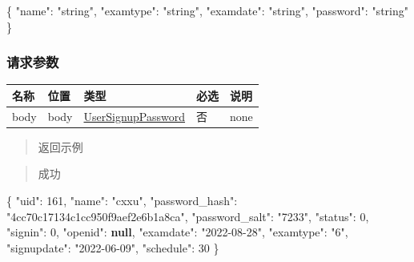 \documentclass[
]{article}
\newenvironment{Shaded}{}{}
\newcommand{\DataTypeTok}[1]{\textcolor[rgb]{0.56,0.13,0.00}{#1}}
\newcommand{\DecValTok}[1]{\textcolor[rgb]{0.25,0.63,0.44}{#1}}
\newcommand{\FunctionTok}[1]{\textcolor[rgb]{0.02,0.16,0.49}{#1}}
\newcommand{\KeywordTok}[1]{\textcolor[rgb]{0.00,0.44,0.13}{\textbf{#1}}}
\newcommand{\StringTok}[1]{\textcolor[rgb]{0.25,0.44,0.63}{#1}}
\begin{document}
\begin{Shaded}
\begin{Highlighting}[]
\FunctionTok{\{}
  \DataTypeTok{"name"}\FunctionTok{:} \StringTok{"string"}\FunctionTok{,}
  \DataTypeTok{"examtype"}\FunctionTok{:} \StringTok{"string"}\FunctionTok{,}
  \DataTypeTok{"examdate"}\FunctionTok{:} \StringTok{"string"}\FunctionTok{,}
  \DataTypeTok{"password"}\FunctionTok{:} \StringTok{"string"}
\FunctionTok{\}}
\end{Highlighting}
\end{Shaded}

\hypertarget{ux8bf7ux6c42ux53c2ux6570-20}{%
\subsubsection{请求参数}\label{ux8bf7ux6c42ux53c2ux6570-20}}

\begin{longtable}[]{@{}lllll@{}}
\toprule
名称 & 位置 & 类型 & 必选 & 说明 \\
\midrule
\endhead
body & body &
\protect\hyperlink{schemausersignuppassword}{UserSignupPassword} & 否 &
none \\
\bottomrule
\end{longtable}

\begin{quote}
返回示例
\end{quote}

\begin{quote}
成功
\end{quote}

\begin{Shaded}
\begin{Highlighting}[]
\FunctionTok{\{}
  \DataTypeTok{"uid"}\FunctionTok{:} \DecValTok{161}\FunctionTok{,}
  \DataTypeTok{"name"}\FunctionTok{:} \StringTok{"cxxu"}\FunctionTok{,}
  \DataTypeTok{"password\_hash"}\FunctionTok{:} \StringTok{"4cc70c17134c1cc950f9aef2e6b1a8ca"}\FunctionTok{,}
  \DataTypeTok{"password\_salt"}\FunctionTok{:} \StringTok{"7233"}\FunctionTok{,}
  \DataTypeTok{"status"}\FunctionTok{:} \DecValTok{0}\FunctionTok{,}
  \DataTypeTok{"signin"}\FunctionTok{:} \DecValTok{0}\FunctionTok{,}
  \DataTypeTok{"openid"}\FunctionTok{:} \KeywordTok{null}\FunctionTok{,}
  \DataTypeTok{"examdate"}\FunctionTok{:} \StringTok{"2022{-}08{-}28"}\FunctionTok{,}
  \DataTypeTok{"examtype"}\FunctionTok{:} \StringTok{"6"}\FunctionTok{,}
  \DataTypeTok{"signupdate"}\FunctionTok{:} \StringTok{"2022{-}06{-}09"}\FunctionTok{,}
  \DataTypeTok{"schedule"}\FunctionTok{:} \DecValTok{30}
\FunctionTok{\}}
\end{Highlighting}
\end{Shaded}
\end{document}
